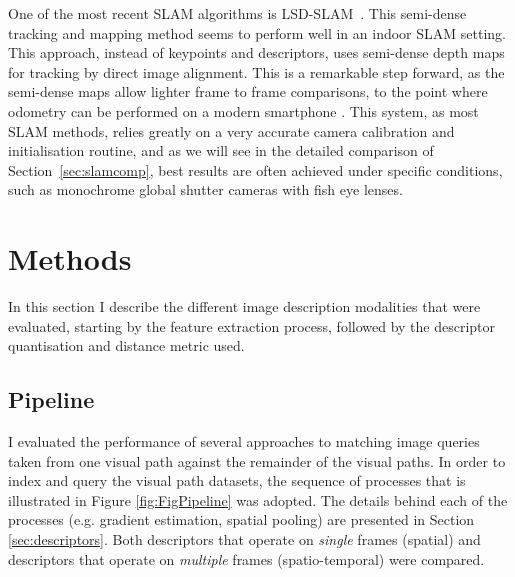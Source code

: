One of the most recent SLAM algorithms is LSD-SLAM~\citep{engel14eccv}. This semi-dense tracking and mapping method seems to perform well in an indoor SLAM setting. This approach, instead of keypoints and descriptors, uses semi-dense depth maps for tracking by direct image alignment. This is a remarkable step forward, as the semi-dense maps allow lighter frame to frame comparisons, to the point where odometry can be performed on a modern smartphone \citep{schoeps14ismar}. This system, as most SLAM methods, relies greatly on a very accurate camera calibration and initialisation routine, and as we will see in the detailed comparison of Section~\ref{sec:slamcomp}, best results are often achieved under specific conditions, such as monochrome global shutter cameras with fish eye lenses.


\section{Methods}
\label{sec:methods}

In this section I describe the different image description modalities that were evaluated, starting by the feature extraction process, followed by the descriptor quantisation and distance metric used.

\subsection{Pipeline}

I evaluated the performance of several approaches to matching image queries taken from one visual path against the remainder of the visual paths.  In order to index and query the visual path datasets, the sequence of processes that is illustrated in Figure \ref{fig:FigPipeline} was adopted. The details behind each of the processes (e.g. gradient estimation, spatial pooling) are presented in Section \ref{sec:descriptors}.  Both descriptors that operate on \textit{single} frames (spatial) and descriptors that operate on \textit{multiple} frames (spatio-temporal) were compared.

